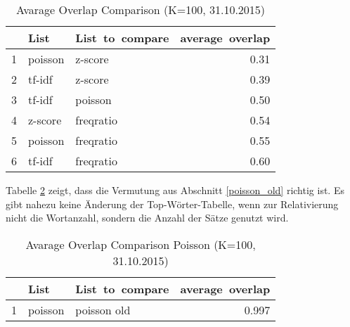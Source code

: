 \begin{table}[ht]
\centering
\begin{tabular}{rllr}
  \hline
 & List & List~to~compare & average~overlap \\ 
  \hline
 1 & poisson & z-score & 0.31 \\ 
 2 & tf-idf & z-score & 0.39 \\ 
 3 & tf-idf & poisson & 0.50 \\ 
 4 & z-score & freqratio & 0.54 \\
 5 & poisson & freqratio & 0.55 \\ 
 6 & tf-idf & freqratio & 0.60 \\ 
   \hline
\end{tabular}
\caption{Avarage Overlap Comparison (K=100, 31.10.2015)} 
\label{AvarageOverlapComparison}
\end{table}
Tabelle \ref{AvarageOverlapComparisonPoisson} zeigt, dass die Vermutung aus Abschnitt \ref{poisson_old} richtig ist. Es gibt nahezu keine Änderung der Top-Wörter-Tabelle, wenn zur Relativierung nicht die Wortanzahl, sondern die Anzahl der Sätze genutzt wird.

\begin{table}[ht]
\centering
\begin{tabular}{rllr}
  \hline
 & List & List~to~compare & average~overlap \\ 
  \hline
1 & poisson & poisson old & 0.997 \\ 
   \hline
\end{tabular}
\caption{Avarage Overlap Comparison Poisson (K=100, 31.10.2015)} 
\label{AvarageOverlapComparisonPoisson}
\end{table}

